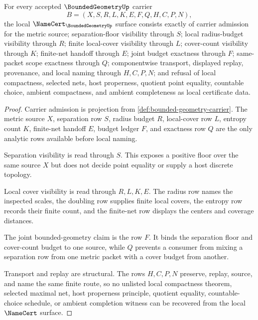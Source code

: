 \begin{theorem}
\label{thm:bounded-geometry-namecert-obligations}
For every accepted $\BoundedGeometryUp$ carrier
$$
B=(X,S,R,L,K,E,F,Q,H,C,P,N),
$$
the local $\NameCert_{\BoundedGeometryUp}$ surface consists exactly of carrier admission for the metric source; separation-floor visibility through $S$; local radius-budget visibility through $R$; finite local-cover visibility through $L$; cover-count visibility through $K$; finite-net handoff through $E$; joint budget exactness through $F$; same-packet scope exactness through $Q$; componentwise transport, displayed replay, provenance, and local naming through $H,C,P,N$; and refusal of local compactness, selected nets, host properness, quotient point equality, countable choice, ambient compactness, and ambient completeness as local certificate data.
\end{theorem}
\begin{proof}
Carrier admission is projection from \autoref{def:bounded-geometry-carrier}. The metric source $X$, separation row $S$, radius budget $R$, local-cover row $L$, entropy count $K$, finite-net handoff $E$, budget ledger $F$, and exactness row $Q$ are the only analytic rows available before local naming.

Separation visibility is read through $S$. This exposes a positive floor over the same source $X$ but does not decide point equality or supply a host discrete topology.

Local cover visibility is read through $R,L,K,E$. The radius row names the inspected scales, the doubling row supplies finite local covers, the entropy row records their finite count, and the finite-net row displays the centers and coverage distances.

The joint bounded-geometry claim is the row $F$. It binds the separation floor and cover-count budget to one source, while $Q$ prevents a consumer from mixing a separation row from one metric packet with a cover budget from another.

Transport and replay are structural. The rows $H,C,P,N$ preserve, replay, source, and name the same finite route, so no unlisted local compactness theorem, selected maximal net, host properness principle, quotient equality, countable-choice schedule, or ambient completion witness can be recovered from the local $\NameCert$ surface.
\end{proof}

